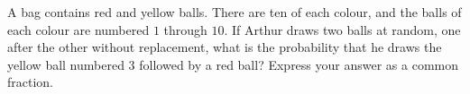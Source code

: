 A bag contains red and yellow balls. There are ten of each colour, and the balls of each colour are numbered $1$ through $10$. If Arthur draws two balls at random, one after the other without replacement, what is the probability that he draws the yellow ball numbered $3$ followed by a red ball? Express your answer as a common fraction.
